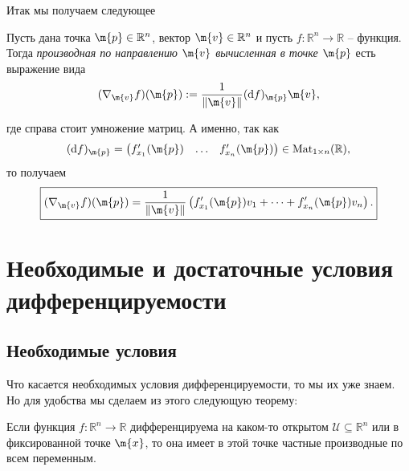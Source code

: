 Итак мы получаем следующее
\begin{definition}
    Пусть дана точка $\m{p} \in \mathbb{R}^n$, вектор $\m{v}\in \mathbb{R}^n$ и пусть $f:\mathbb{R}^n \to \mathbb{R}$ -- функция. Тогда \textit{производная по направлению $\m{v}$ вычисленная в точке $\m{p}$} есть выражение вида
    \[
     (\nabla_\m{v}f)(\m{p}): = \frac{1}{\| \m{v}\|} (\mathrm{d}f)_\m{p} \m{v},
    \]
\end{definition}
где справа стоит умножение матриц. А именно, так как
\[
 (\mathrm{d}f)_\m{p} = \begin{pmatrix}
     f'_{x_1}(\m{p}) & \ldots & f'_{x_n}(\m{p})
 \end{pmatrix} \in \mathrm{Mat}_{1\times n}(\mathbb{R}),
\]
то получаем
\[
 \boxed{
 (\nabla_\m{v}f)(\m{p}) =\frac{1}{\|\m{v}\|} \left(  f'_{x_1}(\m{p})v_1 + \cdots + f'_{x_n}(\m{p}) v_n\right).
 }
\]

\section{Необходимые и достаточные условия дифференцируемости}

\subsection{Необходимые условия}

Что касается необходимых условия дифференцируемости, то мы их уже знаем. Но для удобства мы сделаем из этого следующую теорему:



\begin{theorem}
    Если функция $f:\mathbb{R}^n \to \mathbb{R}$ дифференцируема на каком-то открытом $\mathscr{U} \subseteq \mathbb{R}^n$ или в фиксированной точке $\m{x}$, то она имеет в этой точке частные производные по всем переменным.
\end{theorem}


